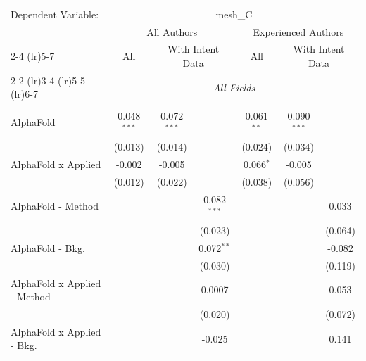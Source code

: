 \begingroup
\centering
\begin{tabular}{lcccccc}
   \tabularnewline \midrule \midrule
   Dependent Variable: & \multicolumn{6}{c}{mesh\_C}\\
 & \multicolumn{3}{c}{All Authors} & \multicolumn{3}{c}{Experienced Authors} \\
\cmidrule(lr){2-4} \cmidrule(lr){5-7}
 & \multicolumn{1}{c}{All} & \multicolumn{2}{c}{With Intent Data} & \multicolumn{1}{c}{All} & \multicolumn{2}{c}{With Intent Data} \\
\cmidrule(lr){2-2} \cmidrule(lr){3-4} \cmidrule(lr){5-5} \cmidrule(lr){6-7}
 & \multicolumn{6}{c}{\textit{All Fields}} \\ \\
   AlphaFold                      & 0.048$^{***}$ & 0.072$^{***}$ &               & 0.061$^{**}$  & 0.090$^{***}$  &   \\   
                                  & (0.013)       & (0.014)       &               & (0.024)       & (0.034)        &   \\   
   AlphaFold x Applied            & -0.002        & -0.005        &               & 0.066$^{*}$   & -0.005         &   \\   
                                  & (0.012)       & (0.022)       &               & (0.038)       & (0.056)        &   \\   
   AlphaFold - Method             &               &               & 0.082$^{***}$ &               &                & 0.033\\   
                                  &               &               & (0.023)       &               &                & (0.064)\\   
   AlphaFold - Bkg.               &               &               & 0.072$^{**}$  &               &                & -0.082\\   
                                  &               &               & (0.030)       &               &                & (0.119)\\   
   AlphaFold x Applied - Method   &               &               & 0.0007        &               &                & 0.053\\   
                                  &               &               & (0.020)       &               &                & (0.072)\\   
   AlphaFold x Applied - Bkg.     &               &               & -0.025        &               &                & 0.141\\   

\end{tabular}
